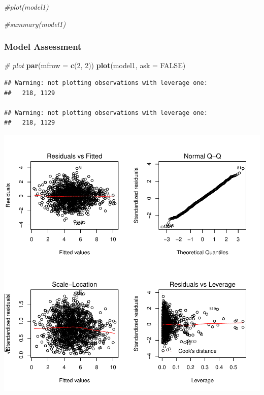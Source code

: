 \documentclass[]{article}
\newenvironment{Shaded}{\begin{snugshade}}{\end{snugshade}}
\newcommand{\CommentTok}[1]{\textcolor[rgb]{0.56,0.35,0.01}{\textit{#1}}}
\newcommand{\DataTypeTok}[1]{\textcolor[rgb]{0.13,0.29,0.53}{#1}}
\newcommand{\DecValTok}[1]{\textcolor[rgb]{0.00,0.00,0.81}{#1}}
\newcommand{\KeywordTok}[1]{\textcolor[rgb]{0.13,0.29,0.53}{\textbf{#1}}}
\newcommand{\NormalTok}[1]{#1}
\newcommand{\OtherTok}[1]{\textcolor[rgb]{0.56,0.35,0.01}{#1}}
\begin{document}
\begin{Shaded}
\begin{Highlighting}[]
\CommentTok{#plot(model1)}

\CommentTok{#summary(model1)}
\end{Highlighting}
\end{Shaded}

\hypertarget{model-assessment}{%
\subsubsection{Model Assessment}\label{model-assessment}}

\begin{Shaded}
\begin{Highlighting}[]
\CommentTok{# plot}
\KeywordTok{par}\NormalTok{(}\DataTypeTok{mfrow =} \KeywordTok{c}\NormalTok{(}\DecValTok{2}\NormalTok{, }\DecValTok{2}\NormalTok{))}
\KeywordTok{plot}\NormalTok{(model1, }\DataTypeTok{ask =} \OtherTok{FALSE}\NormalTok{)}
\end{Highlighting}
\end{Shaded}

\begin{verbatim}
## Warning: not plotting observations with leverage one:
##   218, 1129

## Warning: not plotting observations with leverage one:
##   218, 1129
\end{verbatim}

\includegraphics{Part-I-Writeup_files/figure-latex/res plot-1.pdf}
\end{document}

